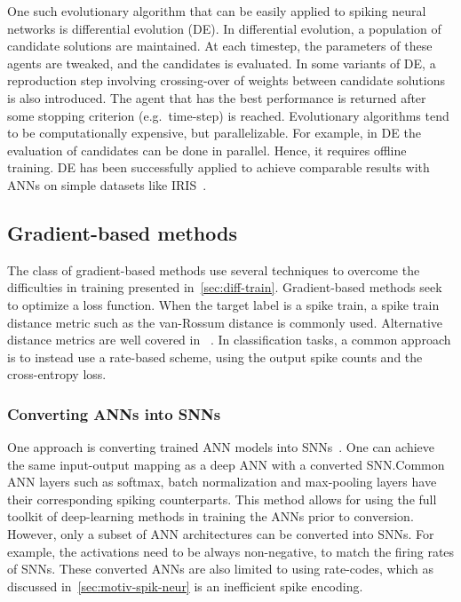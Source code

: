 \documentclass[fyp]{socreport}
\begin{document}
One such evolutionary algorithm that can be easily applied to spiking neural
networks is differential evolution (DE). In differential evolution, a population
of candidate solutions are maintained. At each timestep, the parameters of these
agents are tweaked, and the candidates is evaluated. In some variants of DE, a
reproduction step involving crossing-over of weights between candidate solutions
is also introduced. The agent that has the best performance is returned after
some stopping criterion (e.g.\ time-step) is reached. Evolutionary algorithms
tend to be computationally expensive, but parallelizable. For example, in DE the
evaluation of candidates can be done in parallel. Hence, it requires offline
training. DE has been successfully applied to achieve comparable results with
ANNs on simple datasets like IRIS~\cite{pavlidisil_spikin}.

\subsection{Gradient-based methods}

The class of gradient-based methods use several techniques to overcome the
difficulties in training presented in~\autoref{sec:diff-train}. Gradient-based
methods seek to optimize a loss function. When the target label is a spike
train, a spike train distance metric such as the van-Rossum distance is commonly
used. Alternative distance metrics are well covered in
~\cite{victor05_spike_train_metric}. In classification tasks, a common approach
is to instead use a rate-based scheme, using the output spike counts and the
cross-entropy loss.

\subsubsection{Converting ANNs into SNNs}

One approach is converting trained ANN models into
SNNs~\cite{rueckauer16_theor_tools_conver_analog_to,zambrano16_fast_effic_async_neural_comput}.
One can achieve the same input-output mapping as a deep ANN with a converted
SNN.\@ Common ANN layers such as softmax, batch normalization and max-pooling
layers have their corresponding spiking counterparts. This method allows for
using the full toolkit of deep-learning methods in training the ANNs prior to
conversion. However, only a subset of ANN architectures can be converted into
SNNs. For example, the activations need to be always non-negative, to match the
firing rates of SNNs. These converted ANNs are also limited to using rate-codes,
which as discussed in~\autoref{sec:motiv-spik-neur} is an inefficient spike
encoding.
\end{document}
